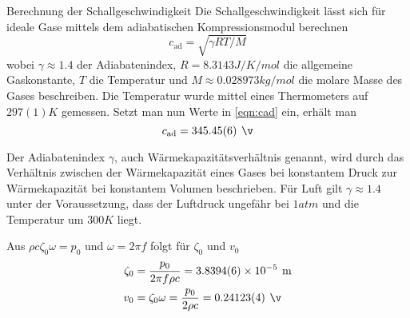 \documentclass{alex_gp}
\begin{document}
\begin{mybox}{Berechnung der Schallgeschwindigkeit}
	Die Schallgeschwindigkeit lässt sich für ideale Gase mittels dem adiabatischen Kompressionsmodul berechnen 
	\begin{equation}\label{eqn:cad}
		c_{\text{ad}} = \sqrt{\gamma RT/M}
	\end{equation}
	wobei \( \gamma \approx 1.4 \) der Adiabatenindex, \( R = 8.3143 \unit{J/K/mol} \) die allgemeine Gaskonstante, \( T \) die Temperatur und \( M \approx 0.028973 \unit{kg/mol} \) die molare Masse des Gases beschreiben.
	Die Temperatur wurde mittel eines Thermometers auf \( 297(1) \unit{K} \) gemessen. 
	Setzt man nun Werte in \autoref{eqn:cad} ein, erhält man 
	\begin{equation}\label{eqn:cad2}
		c_{\text{ad}} = 345.45(6) \unit{\v}
	\end{equation}
	
	
	
	Der Adiabatenindex \( \gamma \), auch Wärmekapazitätsverhältnis genannt, wird durch das Verhältnis zwischen der Wärmekapazität eines Gases bei konstantem Druck zur Wärmekapazität bei konstantem Volumen beschrieben. 
	Für Luft gilt \( \gamma \approx 1.4 \) unter der Voraussetzung, dass der Luftdruck ungefähr bei \( 1 \unit{atm} \) und die Temperatur um \( 300 \unit{K} \) liegt.
	
	Aus \( 	\rho c \zeta_0 \omega = p_0 \) und \( \omega = 2\pi f \) folgt für \( \zeta_0 \) und \( v_0 \)
	\begin{align}\label{key}
		\zeta_0 &= \frac{p_0}{2\pi f\rho c} = 3.8394(6) \times 10^{-5} \unit{m} \\
		v_0 &= \zeta_0\omega = \frac{p_0}{2\rho c} = 0.24123(4) \unit{\v} 
	\end{align}
\end{mybox}
\end{document}
